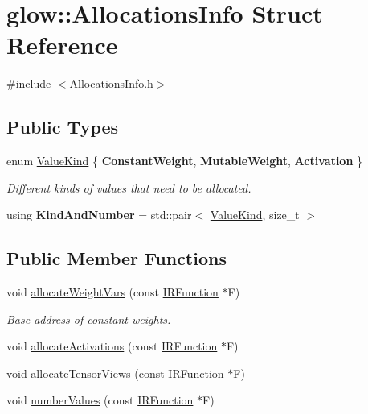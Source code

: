 \hypertarget{structglow_1_1_allocations_info}{}\section{glow\+:\+:Allocations\+Info Struct Reference}
\label{structglow_1_1_allocations_info}


{\ttfamily \#include $<$Allocations\+Info.\+h$>$}

\subsection*{Public Types}
\begin{DoxyCompactItemize}
\item 
\mbox{\label{structglow_1_1_allocations_info_a567e8d6e8893ba370bd2cd45a34a31f3}} 
enum \hyperlink{structglow_1_1_allocations_info_a567e8d6e8893ba370bd2cd45a34a31f3}{Value\+Kind} \{ {\bfseries Constant\+Weight}, 
{\bfseries Mutable\+Weight}, 
{\bfseries Activation}
 \}\begin{DoxyCompactList}\small\item\em Different kinds of values that need to be allocated. \end{DoxyCompactList}
\item 
\mbox{\label{structglow_1_1_allocations_info_a459d3668174199d9fd8c0252acb4b3f6}} 
using {\bfseries Kind\+And\+Number} = std\+::pair$<$ \hyperlink{structglow_1_1_allocations_info_a567e8d6e8893ba370bd2cd45a34a31f3}{Value\+Kind}, size\+\_\+t $>$
\end{DoxyCompactItemize}
\subsection*{Public Member Functions}
\begin{DoxyCompactItemize}
\item 
void \hyperlink{structglow_1_1_allocations_info_ac70e8e115d01733786ccb39c431a073c}{allocate\+Weight\+Vars} (const \hyperlink{classglow_1_1_i_r_function}{I\+R\+Function} $\ast$F)
\begin{DoxyCompactList}\small\item\em Base address of constant weights. \end{DoxyCompactList}\item 
void \hyperlink{structglow_1_1_allocations_info_a6e2463d5e6b2670eec88016d5ea423ce}{allocate\+Activations} (const \hyperlink{classglow_1_1_i_r_function}{I\+R\+Function} $\ast$F)
\item 
void \hyperlink{structglow_1_1_allocations_info_a8dcf9e71b8e280865ca169e7a3f8f947}{allocate\+Tensor\+Views} (const \hyperlink{classglow_1_1_i_r_function}{I\+R\+Function} $\ast$F)
\item 
void \hyperlink{structglow_1_1_allocations_info_ab816fe2907d4901209b6b08a436e97e8}{number\+Values} (const \hyperlink{classglow_1_1_i_r_function}{I\+R\+Function} $\ast$F)
\end{DoxyCompactItemize}
